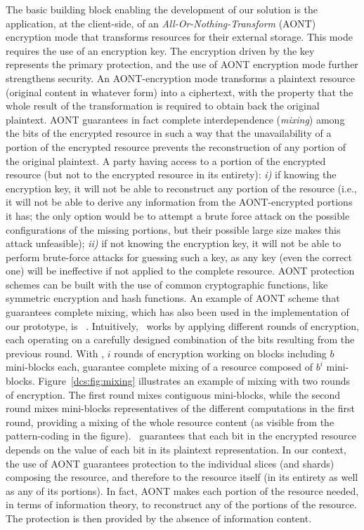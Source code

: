 The basic building block enabling the development of our solution is
the application, at the client-side, of an {\em
  All-Or-Nothing-Transform\/} (AONT) encryption mode that transforms
resources for their external storage.  This mode requires the use of
an encryption key. The encryption driven by the key represents the
primary protection, and the use of AONT encryption mode further
strengthens security. An AONT-encryption mode transforms a plaintext
resource (original content in whatever form) into a ciphertext, with
the property that the whole result of the transformation is required
to obtain back the original plaintext. AONT guarantees in fact
complete interdependence ({\em mixing\/}) among the bits of the
encrypted resource in such a way that the unavailability of a portion
of the encrypted resource prevents the reconstruction of any portion
of the original plaintext. A party having access to a portion of the
encrypted resource (but not to the encrypted resource in its
entirety): {\em i)\/} if knowing the encryption key, it will not be able
to reconstruct any portion of the resource (i.e., it will not be able
to derive any information from the AONT-encrypted portions it has; the
only option would be to attempt a brute force attack on the possible
configurations of the missing portions, but their possible large size
makes this attack unfeasible); {\em ii)\/} if not knowing the
encryption key, it will not be able to perform brute-force attacks for
guessing such a key, as any key (even the correct one) will be
ineffective if not applied to the complete resource.  AONT protection
schemes can be built with the use of common cryptographic functions,
like symmetric encryption and hash functions.  An example of AONT
scheme that guarantees complete mixing, which has also been used in
the implementation of our prototype, is
\name~\cite{bdfprs-ccs2016}. Intuitively, \name\ works by applying
different rounds of encryption, each operating on a carefully designed
combination of the bits resulting from the previous round.  With
\name, $i$ rounds of encryption working on blocks including $b$
mini-blocks each, guarantee complete mixing of a resource composed of
$b^i$ mini-blocks.  Figure~\ref{dcs:fig:mixing} illustrates an example of
mixing with two rounds of encryption. The first round mixes contiguous
mini-blocks, while the second round mixes mini-blocks representatives
of the different computations in the first round, providing a mixing
of the whole resource content (as visible from the pattern-coding in
the figure).  \name\ guarantees that each bit in the encrypted
resource depends on the value of each bit in its plaintext
representation.  In our context, the use of AONT guarantees protection
to the individual slices (and shards) composing the resource, and
therefore to the resource itself (in its entirety as well as any of
its portions). In fact, AONT makes each portion of the resource
needed, in terms of information theory, to reconstruct any of the
portions of the resource. The protection is then provided by the
absence of information content.

